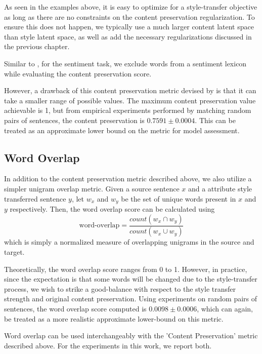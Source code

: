 As seen in the examples above, it is easy to optimize for a style-transfer objective as long as there are no constraints on the content preservation regularization. To ensure this does not happen, we typically use a much larger content latent space than style latent space, as well as add the necessary regularizations discussed in the previous chapter.

Similar to \cite{fu2017style}, for the sentiment task, we exclude words from a sentiment lexicon \citep{hu2004mining} while evaluating the content preservation score.

However, a drawback of this content preservation metric devised by \cite{fu2017style} is that it can take a smaller range of possible values. The maximum content preservation value achievable is 1, but from empirical experiments performed by matching random pairs of sentences, the content preservation is $0.7591 \pm 0.0004$. This can be treated as an approximate lower bound on the metric for model assessment.

\subsection{Word Overlap}

In addition to the content preservation metric described above, we also utilize a simpler unigram overlap metric. Given a source sentence $x$ and a attribute style transferred sentence $y$, let $w_x$ and $w_y$ be the set of unique words present in $x$ and $y$ respectively. Then, the word overlap score can be calculated using
\begin{equation*}
	\text{word-overlap} = \frac{count(w_x \cap w_y)}{count(w_x \cup w_y)}
\end{equation*}
which is simply a normalized measure of overlapping unigrams in the source and target.

Theoretically, the word overlap score ranges from 0 to 1. However, in practice, since the expectation is that some words will be changed due to the style-transfer process, we wish to strike a good-balance with respect to the style transfer strength and original content preservation. Using experiments on random pairs of sentences, the word overlap score computed is $0.0098 \pm 0.0006$, which can again, be treated as a more realistic approximate lower-bound on this metric.

Word overlap can be used interchangeably with the 'Content Preservation' metric described above. For the experiments in this work, we report both.

